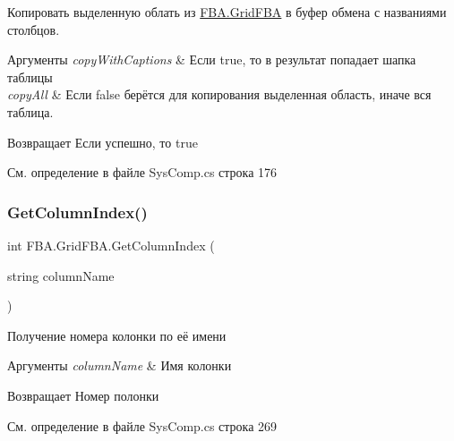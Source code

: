 Копировать выделенную облать из \mbox{\hyperlink{class_f_b_a_1_1_grid_f_b_a}{F\+B\+A.\+Grid\+F\+BA}} в буфер обмена с названиями столбцов. 


\begin{DoxyParams}{Аргументы}
{\em copy\+With\+Captions} & Если true, то в результат попадает шапка таблицы\\
\hline
{\em copy\+All} & Если false берётся для копирования выделенная область, иначе вся таблица.\\
\hline
\end{DoxyParams}
\begin{DoxyReturn}{Возвращает}
Если успешно, то true
\end{DoxyReturn}


См. определение в файле Sys\+Comp.\+cs строка 176

\mbox{\label{class_f_b_a_1_1_grid_f_b_a_a7cb1d7d7cee4041f258cfc38bfa4d52e}} 
\subsubsection{\texorpdfstring{Get\+Column\+Index()}{GetColumnIndex()}}
{\footnotesize\ttfamily int F\+B\+A.\+Grid\+F\+B\+A.\+Get\+Column\+Index (\begin{DoxyParamCaption}\item[{string}]{column\+Name }\end{DoxyParamCaption})}



Получение номера колонки по её имени 


\begin{DoxyParams}{Аргументы}
{\em column\+Name} & Имя колонки\\
\hline
\end{DoxyParams}
\begin{DoxyReturn}{Возвращает}
Номер полонки
\end{DoxyReturn}


См. определение в файле Sys\+Comp.\+cs строка 269

\mbox{\label{class_f_b_a_1_1_grid_f_b_a_a462ecf8ce1122570366b79c08c99f78d}} 

